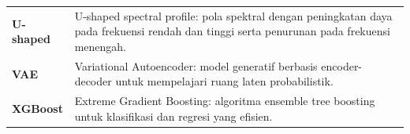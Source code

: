 \begin{longtable}{p{3cm} p{11cm}}
\textbf{U-shaped} & U-shaped spectral profile: pola spektral dengan peningkatan daya pada frekuensi rendah dan tinggi serta penurunan pada frekuensi menengah. \\

\textbf{VAE} & Variational Autoencoder: model generatif berbasis encoder-decoder untuk mempelajari ruang laten probabilistik. \\

\textbf{XGBoost} & Extreme Gradient Boosting: algoritma ensemble tree boosting untuk klasifikasi dan regresi yang efisien. \\

\end{longtable}